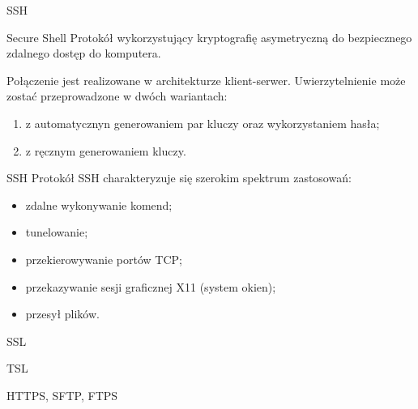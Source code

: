 \begin{frame}{SSH}
	\begin{alertblock}{Secure Shell}
		Protokół wykorzystujący kryptografię asymetryczną do bezpiecznego zdalnego dostęp do komputera. 
	\end{alertblock}
	
	Połączenie jest realizowane w architekturze klient-serwer. Uwierzytelnienie może zostać przeprowadzone w dwóch wariantach:
	\begin{enumerate}
		\item z automatycznyn generowaniem par kluczy oraz wykorzystaniem hasła;
		\item z ręcznym generowaniem kluczy.
	\end{enumerate}
	
\end{frame}

\begin{frame}{SSH}
	Protokół SSH charakteryzuje się szerokim spektrum zastosowań:
	\begin{itemize}
		\item zdalne wykonywanie komend;
		\item tunelowanie;
		\item przekierowywanie portów TCP;
		\item przekazywanie sesji graficznej X11 (system okien);
		\item przesył plików.
	\end{itemize}
\end{frame}

\begin{frame}{SSL}
	
\end{frame}

\begin{frame}{TSL}
	
\end{frame}

\begin{frame}{HTTPS, SFTP, FTPS}
	
\end{frame}

